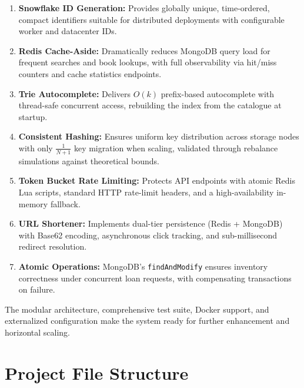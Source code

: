 \documentclass[12pt,a4paper]{report}
\begin{document}
\begin{enumerate}
    \item \textbf{Snowflake ID Generation:} Provides globally unique, time-ordered, compact identifiers suitable for distributed deployments with configurable worker and datacenter IDs.

    \item \textbf{Redis Cache-Aside:} Dramatically reduces MongoDB query load for frequent searches and book lookups, with full observability via hit/miss counters and cache statistics endpoints.

    \item \textbf{Trie Autocomplete:} Delivers $O(k)$ prefix-based autocomplete with thread-safe concurrent access, rebuilding the index from the catalogue at startup.

    \item \textbf{Consistent Hashing:} Ensures uniform key distribution across storage nodes with only $\frac{1}{N+1}$ key migration when scaling, validated through rebalance simulations against theoretical bounds.

    \item \textbf{Token Bucket Rate Limiting:} Protects API endpoints with atomic Redis Lua scripts, standard HTTP rate-limit headers, and a high-availability in-memory fallback.

    \item \textbf{URL Shortener:} Implements dual-tier persistence (Redis + MongoDB) with Base62 encoding, asynchronous click tracking, and sub-millisecond redirect resolution.

    \item \textbf{Atomic Operations:} MongoDB's \texttt{findAndModify} ensures inventory correctness under concurrent loan requests, with compensating transactions on failure.
\end{enumerate}

The modular architecture, comprehensive test suite, Docker support, and externalized configuration make the system ready for further enhancement and horizontal scaling.

\appendix
\chapter{Project File Structure}
\end{document}
